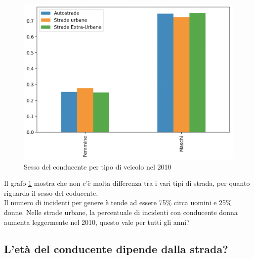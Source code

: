 \documentclass[a4paper]{report}
\begin{document}
\begin{figure}
    \includegraphics[width=\linewidth]{../src/incidenti/incidenti_senza_coords/tipo_veicoli/uomo-donna.png}
    \caption{Sesso del conducente per tipo di veicolo nel 2010}
    \label{fig:differenza-uomo-donna}
\end{figure}

Il grafo \ref{fig:differenza-uomo-donna} mostra che non c'è molta differenza tra i vari tipi di 
strada, per quanto riguarda il sesso del coducente.\\
Il numero di incidenti per genere è tende ad essere 75\% circa uomini e 25\% donne.
Nelle strade  urbane, la percentuale di incidenti con conducente donna aumenta leggermente nel 2010, 
questo vale per tutti gli anni?


\subsection{L'età del conducente dipende dalla strada?}
\end{document}
